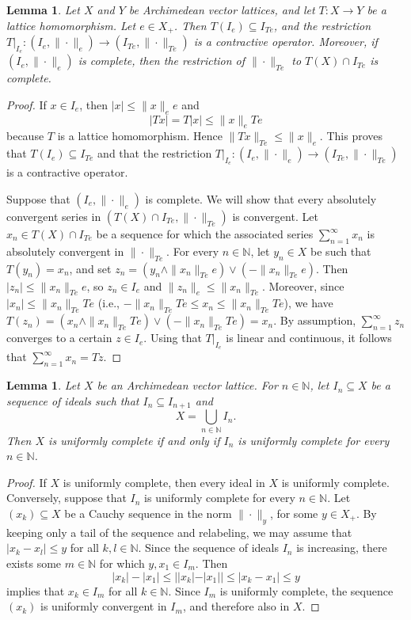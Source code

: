 \documentclass{amsart}
\theoremstyle{plain}
\newtheorem{lem}[thm]{Lemma}
\theoremstyle{definition}
\theoremstyle{remark}
\newcommand\N{\ensuremath{\mathbb{N}}}
\begin{document}
\begin{lem}\label{lem:prelim1}
    Let $X$ and $Y$ be Archimedean vector lattices, and let $T\colon
    X\to Y$ be a lattice homomorphism. Let $e \in X_+$. Then
    $T(I_e)\subseteq I_{Te}$, and the restriction $T|_{I_e}\colon
    (I_e,\|{\cdot }\|_e)\to (I_{Te},\|{\cdot }\|_{Te})$ is a
    contractive operator. Moreover, if $(I_e,\|{\cdot }\|_e)$ is
    complete, then the restriction of $\|{\cdot }\|_{Te}$ to
    $T(X)\cap I_{Te}$ is complete.
\end{lem}
\begin{proof}
    If $x \in I_e$, then $|x|\le \|x\|_e e$ and
    \[
    |Tx|=T|x|\le \|x\|_e Te
    \]
    because $T$ is a lattice homomorphism. Hence $\|Tx\|_{Te}\le
    \|x\|_e$. This proves that $T(I_e)\subseteq I_{Te}$ and that
    the restriction $T|_{I_e}\colon (I_e,\|{\cdot }\|_e)\to
    (I_{Te},\|{\cdot }\|_{Te})$ is a contractive operator.

    Suppose that $(I_e,\|{\cdot }\|_e)$ is complete. We will show that
    every absolutely convergent series in $(T(X)\cap I_{Te}, \|{\cdot
    }\|_{Te})$ is convergent. Let $x_n \in T(X)\cap I_{Te}$ be a
    sequence for which the associated series $\sum_{n=1}^{\infty}x_n$ is
    absolutely convergent in $\|{\cdot }\|_{Te}$. For every $n \in
    \N$, let $y_n \in X$ be such that $T(y_n)=x_n$, and set $z_n=(y_n
    \wedge \|x_n\|_{Te}e)\vee (-\|x_n\|_{Te}e)$. Then $|z_n|\le
    \|x_n\|_{Te}e$, so $z_n \in I_e$ and $\|z_n\|_{e}\le
    \|x_n\|_{Te}$. Moreover, since $|x_n|\le \|x_n\|_{Te}Te$ (i.e.,
    $-\|x_n\|_{Te}Te\le x_n\le \|x_n\|_{Te}Te$), we have $T(z_n)=(x_n
    \wedge \|x_n\|_{Te}Te)\vee (-\|x_n\|_{Te}Te)=x_n$. By assumption,
    $\sum_{n=1}^{\infty}z_n$ converges to a certain $z \in I_e$. Using
    that $T|_{I_e}$ is linear and continuous, it follows that
    $\sum_{n=1}^{\infty}x_n=Tz$.
\end{proof}

\begin{lem}\label{lem:prelim2}
    Let $X$ be an Archimedean vector lattice. For $n \in \N$, let $I_n\subseteq X$
    be a sequence of ideals such that $I_n\subseteq I_{n+1}$ and
    \[
    X=\bigcup_{n \in \N} I_n.
    \]
    Then $X$ is uniformly complete if and only if $I_n$ is uniformly
    complete for every $n \in \N$.
\end{lem}
\begin{proof}
    If $X$ is uniformly complete, then every ideal in $X$ is uniformly
    complete. Conversely, suppose that $I_n$ is uniformly complete for every $n \in \N$.
    Let $(x_k)\subseteq X$ be a Cauchy sequence in the norm $\|{\cdot }\|_y$, for some
    $y \in X_+$. By keeping only a tail of the sequence and relabeling, we may assume
    that $|x_k-x_l|\le y$ for all $k,l \in \N$. Since the sequence of
    ideals $I_n$ is increasing, there exists some $m \in \N$ for which
    $y,x_1\in I_m$. Then
    \[
    |x_k|-|x_1|\le | |x_k| - |x_1| |\le |x_k-x_1|\le y
    \]
    implies that $x_k \in I_m$ for all $k \in \N$. Since $I_m$ is
    uniformly complete, the sequence $(x_k)$ is uniformly convergent
    in $I_m$, and therefore also in $X$.
\end{proof}
\end{document}
